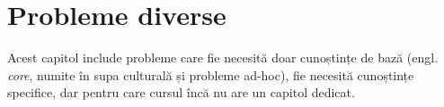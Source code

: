 \documentclass[../main.tex]{subfiles}
\begin{document}
\chapter{Probleme diverse}

Acest capitol include probleme care fie necesită doar cunoștințe de bază (engl. \textit{core}, numite în supa culturală și probleme ad-hoc), fie necesită cunoștințe specifice, dar pentru care cursul încă nu are un capitol dedicat.
\end{document}
